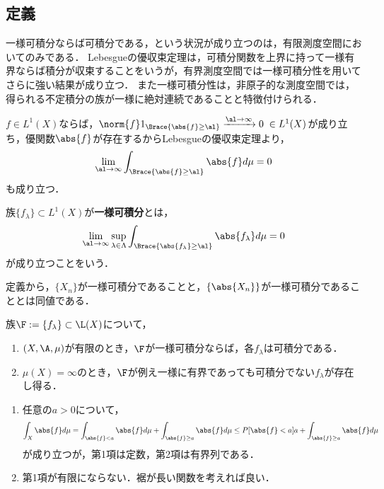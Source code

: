 \documentclass[uplatex,dvipdfmx]{jsreport}
\begin{document}
\subsection{定義}

\begin{tcolorbox}[colframe=ForestGreen, colback=ForestGreen!10!white,breakable,colbacktitle=ForestGreen!40!white,coltitle=black,fonttitle=\bfseries\sffamily,
title=]
    一様可積分ならば可積分である，という状況が成り立つのは，有限測度空間においてのみである．
    Lebesgueの優収束定理は，可積分関数を上界に持って一様有界ならば積分が収束することをいうが，有界測度空間では一様可積分性を用いてさらに強い結果が成り立つ．
    また一様可積分性は，非原子的な測度空間では，得られる不定積分の族が一様に絶対連続であることと特徴付けられる．
\end{tcolorbox}

\begin{observation}
    $f\in L^1(X)$ならば，$\norm{f}1_{\Brace{\abs{f}\ge\al}}\xrightarrow{\al\to\infty}0\;\in L^1(X)$が成り立ち，優関数$\abs{f}$が存在するからLebesgueの優収束定理より，
    \[\lim_{\al\to\infty}\int_{\Brace{\abs{f}\ge\al}}\abs{f}d\mu=0\]
    も成り立つ．
\end{observation}

\begin{definition}
    族$\{f_\lambda\}\subset L^1(X)$が\textbf{一様可積分}とは，
    \[\lim_{\al\to\infty}\sup_{\lambda\in\Lambda}\int_{\Brace{\abs{f_\lambda}\ge\al}}\abs{f_\lambda}d\mu=0\]
    が成り立つことをいう．
\end{definition}
\begin{remarks}
    定義から，$\{X_n\}$が一様可積分であることと，$\{\abs{X_n}\}$が一様可積分であることとは同値である．
\end{remarks}

\begin{lemma}
    族$\F:=\{f_\lambda\}\subset \L(X)$について，
    \begin{enumerate}
        \item $(X,\A,\mu)$が有限のとき，$\F$が一様可積分ならば，各$f_\lambda$は可積分である．
        \item $\mu(X)=\infty$のとき，$\F$が例え一様に有界であっても可積分でない$f_\lambda$が存在し得る．
    \end{enumerate}
\end{lemma}
\begin{Proof}\mbox{}
    \begin{enumerate}
        \item 任意の$a>0$について，
        \[\int_X\abs{f}d\mu=\int_{\abs{f}<a}\abs{f}d\mu+\int_{\abs{f}\ge a}\abs{f}d\mu\le P[\abs{f}<a]a+\int_{\abs{f}\ge a}\abs{f}d\mu\]
        が成り立つが，第1項は定数，第2項は有界列である．
        \item 第1項が有限にならない．裾が長い関数を考えれば良い．
    \end{enumerate}
\end{Proof}
\end{document}
